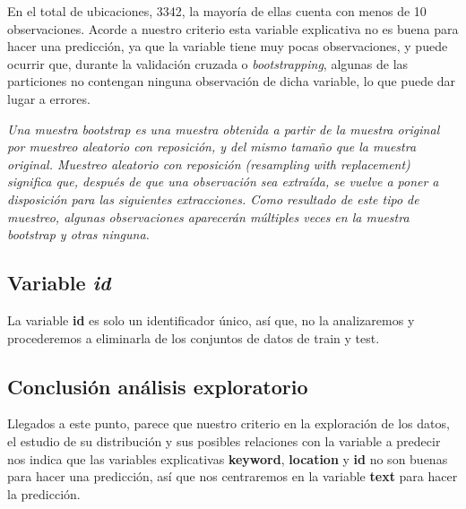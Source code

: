 \documentclass[]{article}
\newenvironment{Shaded}{\begin{snugshade}}{\end{snugshade}}
\newcommand{\NormalTok}[1]{#1}
\newcommand{\OperatorTok}[1]{\textcolor[rgb]{0.81,0.36,0.00}{\textbf{#1}}}
\newcommand{\OtherTok}[1]{\textcolor[rgb]{0.56,0.35,0.01}{#1}}
\newcommand{\StringTok}[1]{\textcolor[rgb]{0.31,0.60,0.02}{#1}}
\begin{document}
En el total de ubicaciones, 3342, la mayoría de ellas cuenta con menos
de 10 observaciones. Acorde a nuestro criterio esta variable explicativa
no es buena para hacer una predicción, ya que la variable tiene muy
pocas observaciones, y puede ocurrir que, durante la validación cruzada
o \emph{bootstrapping}, algunas de las particiones no contengan ninguna
observación de dicha variable, lo que puede dar lugar a errores.

\emph{Una muestra bootstrap es una muestra obtenida a partir de la
muestra original por muestreo aleatorio con reposición, y del mismo
tamaño que la muestra original. Muestreo aleatorio con reposición
(resampling with replacement) significa que, después de que una
observación sea extraída, se vuelve a poner a disposición para las
siguientes extracciones. Como resultado de este tipo de muestreo,
algunas observaciones aparecerán múltiples veces en la muestra bootstrap
y otras ninguna.}

\hypertarget{variable-id}{%
\subsection{\texorpdfstring{Variable
\emph{id}}{Variable id}}\label{variable-id}}

La variable \textbf{id} es solo un identificador único, así que, no la
analizaremos y procederemos a eliminarla de los conjuntos de datos de
train y test.

\begin{Shaded}
\end{Shaded}

\hypertarget{conclusiuxf3n-anuxe1lisis-exploratorio}{%
\subsection{Conclusión análisis
exploratorio}\label{conclusiuxf3n-anuxe1lisis-exploratorio}}

Llegados a este punto, parece que nuestro criterio en la exploración de
los datos, el estudio de su distribución y sus posibles relaciones con
la variable a predecir nos indica que las variables explicativas
\textbf{keyword}, \textbf{location} y \textbf{id} no son buenas para
hacer una predicción, así que nos centraremos en la variable
\textbf{text} para hacer la predicción.
\end{document}
